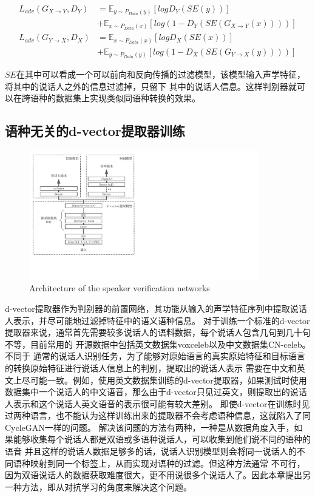 \begin{align}
    L_{adv}(G_{X\rightarrow Y},D_Y) & =\mathbb{E}_{y\sim P_{Data}(y)}\left[log D_Y(SE(y))\right] \\
    & + \mathbb{E}_{x\sim P_{Data}(x)}\left[log(1-D_Y(SE(G_{X\rightarrow Y}(x))))\right] \\
    L_{adv}(G_{Y\rightarrow X},D_X) & =\mathbb{E}_{x\sim P_{Data}(x)}\left[log D_X(SE(x))\right] \\
    & + \mathbb{E}_{y\sim P_{Data}(y)}\left[log(1-D_X(SE(G_{Y\rightarrow X}(y))))\right]
\end{align}

$SE$在其中可以看成一个可以前向和反向传播的过滤模型，该模型输入声学特征，将其中的说话人之外的信息过滤掉，只留下
其中的说话人信息。这样判别器就可以在跨语种的数据集上实现类似同语种转换的效果。



\subsection{语种无关的d-vector提取器训练}


\begin{figure}[!htp]
    \centering
    \includegraphics[width=10cm,trim=0 79 380 0,clip]{figure/5_d.pdf}
    {Architecture of the speaker verification networks}
    \label{fig:5d}
\end{figure}

d-vector提取器作为判别器的前置网络，其功能从输入的声学特征序列中提取说话人表示，并尽可能地过滤掉特征中的语义语种信息。
对于训练一个标准的d-vector提取器来说，通常首先需要较多说话人的语料数据，每个说话人包含几句到几十句不等，目前常用的
开源数据中包括英文数据集voxceleb\cite{nagrani2017voxceleb}以及中文数据集CN-celeb\cite{fan2019cn}。不同于
通常的说话人识别任务，为了能够对原始语言的真实原始特征和目标语言的转换原始特征进行说话人信息上的判别，提取出的说话人表示
需要在中文和英文上尽可能一致。例如，使用英文数据集训练的d-vector提取器，如果测试时使用
数据集中一个说话人的中文语音，那么由于d-vector只见过英文，则提取出的说话人表示和这个说话人英文语音的表示很可能有较大差别。
即使d-vector在训练时见过两种语言，也不能认为这样训练出来的提取器不会考虑语种信息，这就陷入了同CycleGAN一样的问题。
解决该问题的方法有两种，一种是从数据角度入手，如果能够收集每个说话人都是双语或多语种说话人，可以收集到他们说不同的语种的语音
并且这样的说话人数据足够多的话，说话人识别模型则会将同一说话人的不同语种映射到同一个标签上，从而实现对语种的过滤。但这种方法通常
不可行，因为双语说话人的数据获取难度很大，更不用说很多个说话人了。因此本章提出另一种方法，即从对抗学习的角度来解决这个问题。

